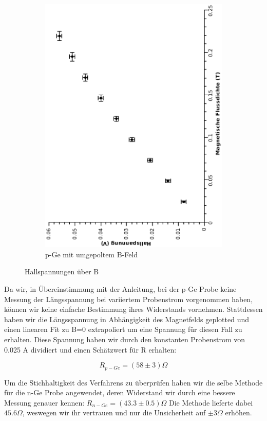 \documentclass[12pt,a4paper,twopage]{article}
\begin{document}
\begin{figure}
\begin{subfigure}{0.4\textwidth}
\includegraphics[width=0.9\linewidth, angle=-90]{ppeumpol.eps}
\caption{p-Ge mit umgepoltem B-Feld}
\end{subfigure}
\caption{Hallspannungen über B\label{hallbimg}}
\end{figure}



Da wir, in Übereinstimmung mit der Anleitung, bei der p-Ge Probe keine Messung der Längsspannung bei variiertem Probenstrom vorgenommen haben, können wir keine einfache Bestimmung ihres Widerstands vornehmen. Stattdessen haben wir die Längsspannung in Abhängigkeit des Magnetfelds geplotted und einen linearen Fit zu B=0 extrapoliert um eine Spannung für diesen Fall zu erhalten. Diese Spannung haben wir durch den konstanten Probenstrom von 0.025 A dividiert und einen Schätzwert für R erhalten:

$$ R_{p-Ge} = (58 \pm 3) \Omega $$

Um die Stichhaltigkeit des Verfahrens zu überprüfen haben wir die selbe Methode für die n-Ge Probe angewendet, deren Widerstand wir durch eine bessere Messung genauer kennen: $R_{n-Ge}=(43.3 \pm 0.5) \Omega$
Die Methode lieferte dabei $45.6 \Omega$, weswegen wir ihr vertrauen und nur die Unsicherheit auf $\pm 3 \Omega$ erhöhen.
\end{document}
